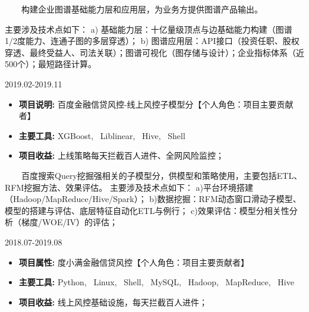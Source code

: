 \documentclass{resume}
\begin{document}
{\begin{itemize}  [parsep=0.5ex]
\end{itemize}


{    \ \ \ \ 构建企业图谱基础能力层和应用层，为业务方提供图谱产品输出。

主要涉及技术点如下：
a) 基础能力层：十亿量级顶点与边基础能力构建（图谱1/2度能力、连通子图的多层穿透）；
b) 图谱应用层：API接口（投资任职、股权穿透、最终受益人、司法关联）；图谱可视化（图存储与设计）；企业指标体系（近500个）；最短路径计算。 }

\medskip















                      {2019.02-2019.11}

\begin{itemize}  [parsep=0.5ex]

  \item   \textbf{  项目说明:  }   {  百度金融信贷风控-线上风控子模型分【个人角色：项目主要贡献者】  }                
  \item   \textbf{  主要工具:  }   {  XGBoost, \ Liblinear, \ Hive, \ Shell  }
  \item   \textbf{  项目收益:  }   {  上线策略每天拦截百人进件、全网风险监控；  }

\end{itemize}


{    \ \ \ \ 百度搜索Query挖掘强相关的子模型分，供模型和策略使用，主要包括ETL、RFM挖掘方法、效果评估。
主要涉及技术点如下：
a)平台环境搭建（Hadoop/MapReduce/Hive/Spark）；
b)数据挖掘：RFM动态窗口滑动子模型、模型的搭建与评估、底层特征自动化ETL与例行；
c)效果评估：模型分相关性分析（梯度/WOE/IV）的评估；
}

\medskip










                             {2018.07-2019.08}

\begin{itemize} [parsep=0.5ex]

  \item   \textbf{  项目属性:  }  {  度小满金融信贷风控【个人角色：项目主要贡献者】  }
  \item   \textbf{  主要工具:  }  {  Python, \ Linux, \ Shell, \ MySQL, \ Hadoop, \ MapReduce, \ Hive }
  \item   \textbf{  项目收益:  }  {  线上风控基础设施，每天拦截百人进件； }


\end{itemize}}
\end{document}
